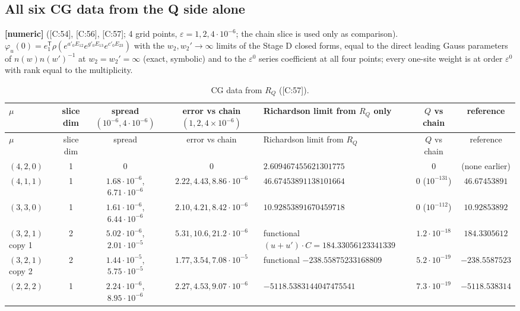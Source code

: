 \documentclass[10pt]{article}
\newcommand{\cl}[2]{\textsf{[#1:#2]}}
\newcommand{\tg}[1]{\textbf{[#1]}}
\begin{document}
\subsection{All six CG data from the Q side alone}\label{sec:Ccg}

\tg{numeric} (\cl{C}{54}, \cl{C}{56}, \cl{C}{57}; 4 grid points, $\varepsilon=1,2,4\cdot10^{-6}$; the chain slice is used only as comparison). $\varphi_u(0)=e_1^{\mathsf T}\rho(e^{a'_0E_{12}}e^{g'_0E_{13}}e^{c'_0E_{23}})$ with the $w_2,w_2'\to\infty$ limits of the Stage D closed forms, equal to the direct leading Gauss parameters of $n(w)n(w')^{-1}$ at $w_2=w_2'=\infty$ (exact, symbolic) and to the $\varepsilon^0$ series coefficient at all four points; every one-site weight is at order $\varepsilon^0$ with rank equal to the multiplicity.
\begin{center}\footnotesize\setlength{\tabcolsep}{2pt}\begin{longtable}{@{}lcccp{3.3cm}cc@{}}
\caption{CG data from $R_Q$ (\cl{C}{57}).}\label{tab:CCG}\\\toprule
$\mu$ & slice dim & spread $(10^{-6},4\cdot10^{-6})$ & error vs chain $(1,2,4\times10^{-6})$ & Richardson limit from $R_Q$ only & $Q$ vs chain & reference \\\midrule\endfirsthead
$\mu$ & slice dim & spread & error vs chain & Richardson limit from $R_Q$ & $Q$ vs chain & reference \\\midrule\endhead
$(4,2,0)$ & 1 & 0 & 0 & $2.609467455621301775$ & 0 & (none earlier) \\
$(4,1,1)$ & 1 & $1.68\cdot10^{-6}$, $6.71\cdot10^{-6}$ & $2.22,4.43,8.86\cdot10^{-6}$ & $46.67453891138101664$ & $0$ ($10^{-131}$) & $46.67453891$ \\
$(3,3,0)$ & 1 & $1.61\cdot10^{-6}$, $6.44\cdot10^{-6}$ & $2.10,4.21,8.42\cdot10^{-6}$ & $10.92853891670459718$ & $0$ ($10^{-112}$) & $10.92853892$ \\
$(3,2,1)$ copy 1 & 2 & $5.02\cdot10^{-6}$, $2.01\cdot10^{-5}$ & $5.31,10.6,21.2\cdot10^{-6}$ & functional $(u+u')\cdot C=184.33056123341339$ & $1.2\cdot10^{-18}$ & $184.3305612$ \\
$(3,2,1)$ copy 2 & 2 & $1.44\cdot10^{-5}$, $5.75\cdot10^{-5}$ & $1.77,3.54,7.08\cdot10^{-5}$ & functional $-238.55875233168809$ & $5.2\cdot10^{-19}$ & $-238.5587523$ \\
$(2,2,2)$ & 1 & $2.24\cdot10^{-6}$, $8.95\cdot10^{-6}$ & $2.27,4.53,9.07\cdot10^{-6}$ & $-5118.5383144047475541$ & $7.3\cdot10^{-19}$ & $-5118.538314$ \\
\bottomrule
\end{longtable}\end{center}
\end{document}
